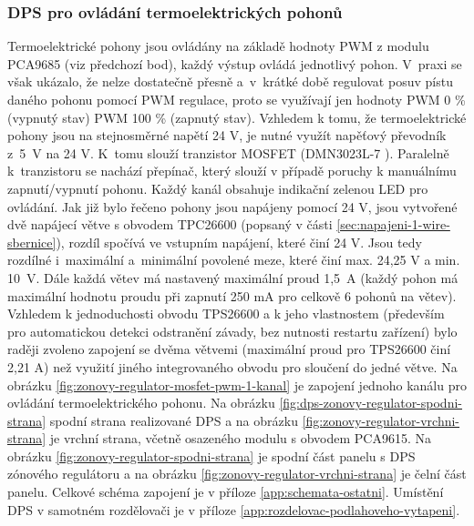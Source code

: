 \subsubsection{DPS pro ovládání termoelektrických pohonů}
Termoelektrické pohony jsou ovládány na základě hodnoty PWM z modulu PCA9685 (viz předchozí bod), každý výstup ovládá jednotlivý pohon. V~praxi se však ukázalo, že nelze dostatečně přesně a~v~krátké době regulovat posuv pístu daného pohonu pomocí PWM regulace, proto se využívají jen hodnoty PWM 0 \% (vypnutý stav) PWM 100 \% (zapnutý stav). Vzhledem k tomu, že termoelektrické pohony jsou na stejnosměrné napětí 24 V, je nutné využít napěťový převodník z~5~V na 24 V. K~tomu slouží tranzistor MOSFET (DMN3023L-7 \cite{dmn3023l}). Paralelně k~tranzistoru se nachází přepínač, který slouží v případě poruchy k manuálnímu zapnutí/vypnutí pohonu.  Každý kanál obsahuje indikační zelenou LED pro ovládání. Jak již bylo řečeno pohony jsou napájeny pomocí 24 V, jsou vytvořené dvě napájecí větve s obvodem TPC26600 (popsaný v části \ref{sec:napajeni-1-wire-sbernice}), rozdíl spočívá ve vstupním napájení, které činí 24 V. Jsou tedy rozdílné i~maximální a~minimální povolené meze, které činí max. 24,25 V a min. 10~V. Dále každá větev má nastavený maximální proud 1,5~A (každý pohon má maximální hodnotu proudu při zapnutí 250 mA pro celkově 6 pohonů na větev). Vzhledem k jednoduchosti obvodu TPS26600 a k jeho vlastnostem (především pro automatickou detekci odstranění závady, bez nutnosti restartu zařízení) bylo raději zvoleno zapojení se dvěma větvemi (maximální proud pro TPS26600 činí 2,21 A) než využití jiného integrovaného obvodu pro sloučení do jedné větve. Na obrázku \ref{fig:zonovy-regulator-mosfet-pwm-1-kanal} je zapojení jednoho kanálu pro ovládání termoelektrického pohonu.  Na obrázku \ref{fig:dps-zonovy-regulator-spodni-strana} spodní strana realizované DPS a na obrázku \ref{fig:zonovy-regulator-vrchni-strana} je vrchní strana, včetně osazeného modulu s obvodem PCA9615. Na obrázku \ref{fig:zonovy-regulator-spodni-strana} je spodní část panelu s DPS zónového regulátoru a na obrázku \ref{fig:zonovy-regulator-vrchni-strana} je čelní část panelu. Celkové schéma zapojení je v příloze \ref{app:schemata-ostatni}. Umístění DPS v samotném rozdělovači je v příloze \ref{app:rozdelovac-podlahoveho-vytapeni}.


